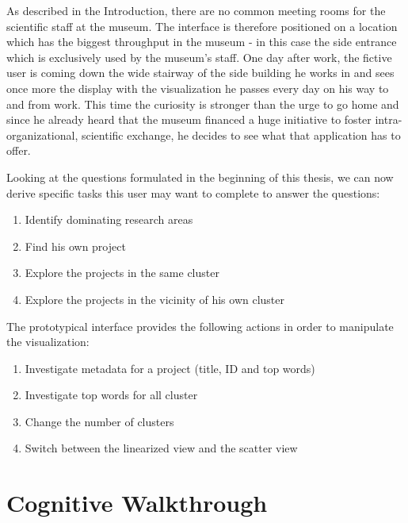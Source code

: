As described in the Introduction, there are no common meeting rooms for the scientific staff at the museum. The interface is therefore positioned on a location which has the biggest throughput in the museum - in this case the side entrance which is exclusively used by the museum's staff. One day after work, the fictive user is coming down the wide stairway of the side building he works in and sees once more the display with the visualization he passes every day on his way to and from work. This time the curiosity is stronger than the urge to go home and since he already heard that the museum financed a huge initiative to foster intra-organizational, scientific exchange, he decides to see what that application has to offer.

Looking at the questions formulated in the beginning of this thesis, we can now derive specific tasks this user may want to complete to answer the questions:
\begin{enumerate}
	\item Identify dominating research areas
	\item Find his own project
	\item Explore the projects in the same cluster
	\item Explore the projects in the vicinity of his own cluster
\end{enumerate}

The prototypical interface provides the following actions in order to manipulate the visualization:
\begin{enumerate}
	\item Investigate metadata for a project (title, ID and top words)
	\item Investigate top words for all cluster
	\item Change the number of clusters
	\item Switch between the linearized view and the scatter view
\end{enumerate}



\section{Cognitive Walkthrough} 

